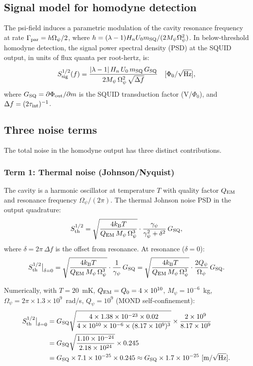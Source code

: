 \documentclass[11pt,twocolumn]{article}
\newcommand{\lam}{\lambda}
\newcommand{\Opsi}{\Omega_\psi}
\newcommand{\gpsi}{\gamma_\psi}
\newcommand{\Mpsi}{M_\psi}
\newcommand{\ee}[1]{\times 10^{#1}}
\newcommand{\kB}{k_{\mathrm{B}}}
\newcommand{\Qpsi}{Q_\psi}
\theoremstyle{definition}
\theoremstyle{remark}
\begin{document}
\subsection{Signal model for homodyne detection}
\label{sec:signal_model}

The psi-field induces a parametric modulation of the cavity resonance
frequency at rate $\Gamma_{\rm par} = h\Opsi/2$, where
$h = (\lam-1)H_n U_0 m_{\rm SQ}/(2\Mpsi\Opsi^2)$.
In below-threshold homodyne detection, the signal power spectral density
(PSD) at the SQUID output, in units of flux quanta per root-hertz, is:
\begin{equation}
S_{\rm sig}^{1/2}(f) = \frac{|\lam-1|\,H_n\,U_0\,m_{\rm SQ}\,G_{\rm SQ}}
{2\Mpsi\,\Opsi^2\,\sqrt{\Delta f}}
\quad [\Phi_0/\sqrt{\rm Hz}],
\label{eq:signal_psd}
\end{equation}
where $G_{\rm SQ} = \partial\Phi_{\rm out}/\partial m$ is the SQUID
transduction factor (V/$\Phi_0$), and $\Delta f = (2\tau_{\rm int})^{-1}$.

\subsection{Three noise terms}
\label{sec:three_noise}

The total noise in the homodyne output has three distinct contributions.

\subsubsection{Term 1: Thermal noise (Johnson/Nyquist)}

The cavity is a harmonic oscillator at temperature $T$ with quality
factor $Q_{\rm EM}$ and resonance frequency $\Opsi/(2\pi)$.
The thermal Johnson noise PSD in the output quadrature:
\begin{equation}
S_{\rm th}^{1/2} = \sqrt{\frac{4\kB T}{Q_{\rm EM}\,\Mpsi\,\Opsi^3}}
\cdot\frac{\gpsi}{\gpsi^2 + \delta^2}\,G_{\rm SQ},
\label{eq:S_thermal}
\end{equation}
where $\delta = 2\pi\,\Delta f$ is the offset from resonance.
At resonance ($\delta = 0$):
\begin{equation}
S_{\rm th}^{1/2}\big|_{\delta=0}
= \sqrt{\frac{4\kB T}{Q_{\rm EM}\,\Mpsi\,\Opsi^3}}\cdot
\frac{1}{\gpsi}\,G_{\rm SQ}
= \sqrt{\frac{4\kB T}{Q_{\rm EM}\,\Mpsi\,\Opsi^3}}\cdot
\frac{2Q_\psi}{\Opsi}\,G_{\rm SQ}.
\label{eq:S_thermal_res}
\end{equation}

Numerically, with $T = 20$~mK, $Q_{\rm EM} = Q_0 = 4\ee{10}$,
$\Mpsi = 10^{-6}$~kg, $\Opsi = 2\pi\times1.3\ee{9}$~rad/s,
$\Qpsi = 10^9$ (MOND self-confinement):
\begin{align}
S_{\rm th}^{1/2}\big|_{\delta=0}
&= G_{\rm SQ}\sqrt{\frac{4\times1.38\ee{-23}\times0.02}
{4\ee{10}\times10^{-6}\times(8.17\ee{9})^3}}
\times\frac{2\ee{9}}{8.17\ee{9}}
\nonumber\\
&= G_{\rm SQ}\sqrt{\frac{1.10\ee{-24}}{2.18\ee{24}}}
\times0.245
\nonumber\\
&= G_{\rm SQ}\times7.1\ee{-25}\times0.245
\approx G_{\rm SQ}\times1.7\ee{-25}~[\mathrm{m/\sqrt{Hz}}].
\label{eq:S_thermal_num}
\end{align}
\end{document}
